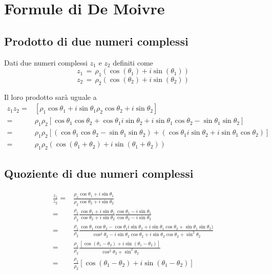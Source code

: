 \documentclass[../../dimostrazioni]{subfiles}
\begin{document}
    \chapter{Formule di De Moivre}

        \section*{Prodotto di due numeri complessi}

            Dati due numeri complessi \(z_1\) e \(z_2\) definiti come
            \[z_1 \, = \, \rho_1(\cos(\theta_1) + i\sin(\theta_1)) \]
            \[z_2 \, = \, \rho_2(\cos(\theta_2) + i\sin(\theta_2)) \]

            Il loro prodotto sarà uguale a
            \begin{align*}
                z_1z_2 =& [\rho_1\cos\theta_1+i\sin\theta_1\rho_2\cos\theta_2+i\sin\theta_2] \\
                       =& \rho_1\rho_2 [\cos\theta_1\cos\theta_2 + \cos\theta_1i\sin\theta_2 + i\sin\theta_1\cos\theta_2 - \sin\theta_1\sin\theta_2] \\
                       =& \rho_1\rho_2 [(\cos\theta_1\cos\theta_2 - \sin\theta_1\sin\theta_2) + (\cos\theta_1 i\sin\theta_2 + i\sin\theta_1\cos\theta_2)] \\
                       =& \rho_1\rho_2 (\cos(\theta_1 + \theta_2) + i\sin(\theta_1 + \theta_2))
            \end{align*}

        \section*{Quoziente di due numeri complessi}

            \begin{align*}
                \frac{z_1}{z_2} =& \frac{\rho_1\cos\theta_1+i\sin\theta_1}{\rho_2\cos\theta_2+i\sin\theta_2} \\
                                =& \frac{\rho_1}{\rho_2} \frac{\cos\theta_1+i\sin\theta_1}{\cos\theta_2+i\sin\theta_2} \frac{\cos\theta_1-i\sin\theta_1}{\cos\theta_2-i\sin\theta_2}\\
                                =& \frac{\rho_1}{\rho_2} \frac{\cos\theta_1\cos\theta_2 - \cos\theta_1 i\sin\theta_2 + i\sin\theta_1\cos\theta_2 + \sin\theta_1\sin\theta_2)}{\cos^2\theta_2 - i\sin\theta_2\cos\theta_2 + i\sin\theta_2\cos\theta_2 + \sin^2\theta_2} \\
                                =& \frac{\rho_1}{\rho_2} \frac{[\cos(\theta_1 - \theta_2) + i\sin(\theta_1 - \theta_2)]}{\cos^2\theta_2 + \sin^2\theta_2} \\
                                =& \frac{\rho_1}{\rho_2} [\cos(\theta_1 - \theta_2) + i\sin(\theta_1 - \theta_2)]
            \end{align*}
\end{document}
